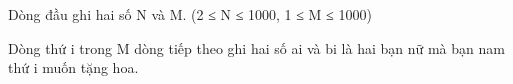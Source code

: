 Dòng đầu ghi hai số N và M. (2 ≤ N ≤ 1000, 1 ≤ M ≤ 1000)  

   Dòng thứ i trong M dòng tiếp theo ghi hai số ai và bi là hai bạn nữ mà bạn nam thứ i muốn tặng hoa.  

\